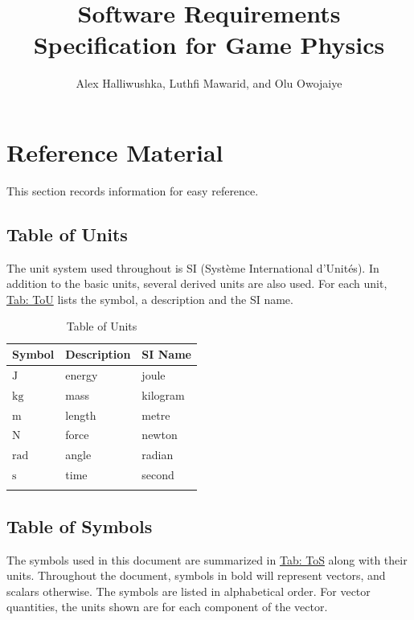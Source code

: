 \documentclass[12pt]{article}
\title{Software Requirements Specification for Game Physics}
\author{Alex Halliwushka, Luthfi Mawarid, and Olu Owojaiye}
\begin{document}
\maketitle
\tableofcontents
\newpage
\section{Reference Material}
\label{Sec:RefMat}
This section records information for easy reference.

\subsection{Table of Units}
\label{Sec:ToU}
The unit system used throughout is SI (Système International d'Unités). In addition to the basic units, several derived units are also used. For each unit, \hyperref[Table:ToU]{Tab: ToU} lists the symbol, a description and the SI name.

\begin{longtable}{l l l}
\toprule
\textbf{Symbol} & \textbf{Description} & \textbf{SI Name}
\\
\midrule
\endhead
${\text{J}}$ & energy & joule
\\
${\text{kg}}$ & mass & kilogram
\\
${\text{m}}$ & length & metre
\\
${\text{N}}$ & force & newton
\\
${\text{rad}}$ & angle & radian
\\
${\text{s}}$ & time & second
\\
\bottomrule
\caption{Table of Units}
\label{Table:ToU}
\end{longtable}
\subsection{Table of Symbols}
\label{Sec:ToS}
The symbols used in this document are summarized in \hyperref[Table:ToS]{Tab: ToS} along with their units. Throughout the document, symbols in bold will represent vectors, and scalars otherwise. The symbols are listed in alphabetical order. For vector quantities, the units shown are for each component of the vector.
\end{document}
